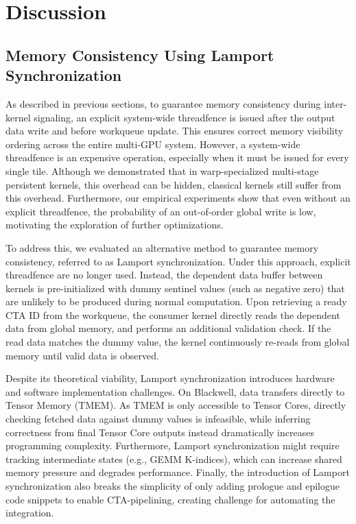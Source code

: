 \section{Discussion} %

\subsection{Memory Consistency Using Lamport Synchronization}

As described in previous sections, to guarantee memory consistency during inter-kernel signaling, an explicit system-wide threadfence is issued after the output data write and before workqueue update. This ensures correct memory visibility ordering across the entire multi-GPU system. However, a system-wide threadfence is an expensive operation, especially when it must be issued for every single tile. Although we demonstrated that in warp-specialized multi-stage persistent kernels, this overhead can be hidden, classical kernels still suffer from this overhead. Furthermore, our empirical experiments show that even without an explicit threadfence, the probability of an out-of-order global write is low, motivating the exploration of further optimizations.

To address this, we evaluated an alternative method to guarantee memory consistency, referred to as Lamport synchronization. Under this approach, explicit threadfence are no longer used. Instead, the dependent data buffer between kernels is pre-initialized with dummy sentinel values (such as negative zero) that are unlikely to be produced during normal computation. Upon retrieving a ready CTA ID from the workqueue, the consumer kernel directly reads the dependent data from global memory, and performs an additional validation check. If the read data matches the dummy value, the kernel continuously re-reads from global memory until valid data is observed.

Despite its theoretical viability, Lamport synchronization introduces hardware and software implementation challenges. On Blackwell, data transfers directly to Tensor Memory (TMEM). As TMEM is only accessible to Tensor Cores, directly checking fetched data against dummy values is infeasible, while inferring correctness from final Tensor Core outputs instead dramatically increases programming complexity. Furthermore, Lamport synchronization might require tracking intermediate states (e.g., GEMM K-indices), which can increase shared memory pressure and degrades performance. Finally, the introduction of Lamport synchronization also breaks the simplicity of only adding prologue and epilogue code snippets to enable CTA-pipelining, creating challenge for automating the integration. 

